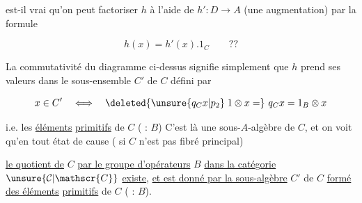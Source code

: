 



est-il vrai qu'on peut factoriser $h$  à l'aide de $h':D\to A$ (une augmentation)  par la formule

\[
h(x)=h'(x).1_C\qquad ??
\]

La commutativité du diagramme ci-dessus signifie simplement que $h$ prend ses valeurs dans le sous-ensemble $C'$ de $C$  défini par

\[
x\in C'\quad\Longleftrightarrow\quad\deleted{\unsure{q_C x|p_2}\;1\otimes x=}\ q_C x=1_B\otimes x
\]

i.e. les \uline{éléments}  \uline{primitifs} de $C$ ( : $B$) C'est là une sous-$A$-algèbre de $C$, et on voit qu'en tout état de cause ( si $C$ n'est pas fibré principal)

\uline{le quotient de} $C$ \uline{par le groupe d'opérateurs} $B$ \uline{dans la catégorie} $\unsure{\mathcal{C}|\mathscr{C}}$ \uline{existe}, \uline{et est donné par la sous-algèbre} $C'$ de $C$ \uline{formé des éléments}   \uline{primitifs} de $C$ ( : $B$).
